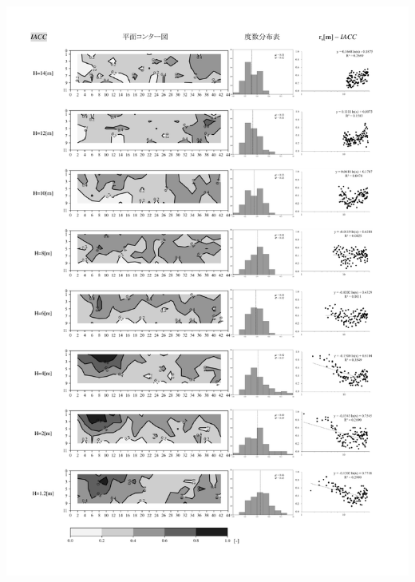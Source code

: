       \begin{minipage}{1\hsize}
        \centering
          \includegraphics[keepaspectratio,width=1\hsize,angle=0]
                          {04_att/Onkyo_rec7.pdf}
      \end{minipage}      